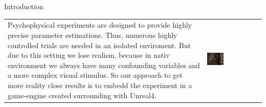 \documentclass[a0paper,portrait]{baposter}
\begin{document}
\begin{poster}
{}



\begin{posterbox}[name=intro,span=2,column=0,row=0]{Introduction}
\begin{tabular}{p{} p{}}
    Psychophysical experiments are designed to provide highly precise parameter estimations. Thus, numerous highly controlled trials are needed in an isolated enviroment. But due to this setting we lose realism, because in nativ environment we always have many confounding variables and a more complex visual stimulus.
    So our approach to get more reality close results is to embedd the experiment in a game-engine created  	surrounding with Unreal4.
    & 
    \vspace{-8pt}
    \includegraphics[width=0.32\textwidth]{race2.png}\\
\end{tabular}

\end{posterbox}


\end{poster}
\end{document}
